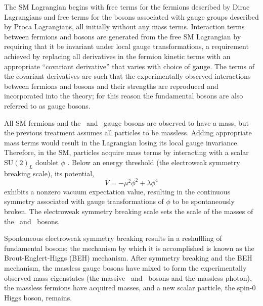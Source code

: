 The SM Lagrangian begins with free terms for the fermions described by Dirac Lagrangians and free terms for the bosons associated with gauge groups described by Proca Lagrangians, all initially without any mass terms.
Interaction terms between fermions and bosons are generated from the free SM Lagrangian by requiring that it be invariant under local gauge transformations, a requirement achieved by replacing all derivatives in the fermion kinetic terms with an appropriate ``covariant derivative'' that varies with choice of gauge.
The terms of the covariant derivatives are such that the experimentally observed interactions between fermions and bosons and their strengths are reproduced and incorporated into the theory; for this reason the fundamental bosons are also referred to as gauge bosons.

All SM fermions and the \PW\ and \PZ\ gauge bosons are observed to have a mass, but the previous treatment assumes all particles to be massless.
Adding appropriate mass terms would result in the Lagrangian losing its local gauge invariance.
Therefore, in the SM, particles acquire mass terms by interacting with a scalar $\mathrm{SU}(2)_L$ doublet $\phi$ \cite{PDG:Higgs}.
Below an energy threshold (the electroweak symmetry breaking scale), its potential,
\begin{equation}
  V = -\mu^2 \phi^2 + \lambda \phi^4
  \label{eq:sm:higgspotential}
\end{equation}
exhibits a nonzero vacuum expectation value, resulting in the continuous symmetry associated with gauge transformations of $\phi$ to be spontaneously broken.
The electroweak symmetry breaking scale sets the scale of the masses of the \PW\ and \PZ\ bosons.

Spontaneous electroweak symmetry breaking results in a reshuffling of fundamental bosons; the mechanism by which it is accomplished is known as the Brout-Englert-Higgs (BEH) mechanism.
After symmetry breaking and the BEH mechanism, the massless gauge bosons have mixed to form the experimentally observed mass eigenstates (the massive \PW\ and \PZ\ bosons and the massless photon), the massless fermions have acquired masses, and a new scalar particle, the spin-0 Higgs boson, remains.

